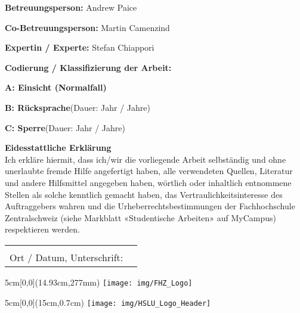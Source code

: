 \vspace{0.6cm}
\noindent
\textbf{Betreuungsperson:} Andrew Paice

\vspace{0.6cm}
\noindent
\textbf{Co-Betreuungsperson:} Martin Camenzind

\vspace{0.6cm}
\noindent
\textbf{Expertin / Experte:} Stefan Chiappori

\vspace{0.6cm}
\noindent
\textbf{Codierung / Klassifizierung der Arbeit:}

\begin{todolist}
	\item[\xmark]\textbf{A: Einsicht (Normalfall)}
	\item \textbf{B: Rücksprache}\hspace*{0.7cm}(Dauer:\hspace*{1cm} Jahr / Jahre)
	\item \textbf{C: Sperre}\hspace*{1.865cm}(Dauer:\hspace*{1cm} Jahr / Jahre)
\end{todolist}

\vfill

\noindent
\textbf{Eidesstattliche Erklärung}
\\
Ich erkläre hiermit, dass ich/wir die vorliegende Arbeit selbständig und ohne unerlaubte fremde Hilfe angefertigt haben, alle verwendeten Quellen, Literatur und andere Hilfsmittel angegeben haben, wörtlich oder inhaltlich entnommene Stellen als solche kenntlich gemacht haben, das Vertraulichkeitsinteresse des Auftraggebers wahren und die Urheberrechtsbestimmungen der Fachhochschule Zentralschweiz (siehe Markblatt «Studentische Arbeiten» auf MyCampus) respektieren werden.

\vspace{1em}

\noindent
\begin{tabularx}{\textwidth}{@{}lX}
	&\\
	Ort / Datum, Unterschrift: &  \\
	\cline{2-2}
\end{tabularx}

\begin{textblock*}{5cm}[0,0](14.93cm,277mm)
	\texttt{[image: img/FHZ\_Logo]}
\end{textblock*}

\newpage

\begin{textblock*}{5cm}[0,0](15cm,0.7cm)
	\texttt{[image: img/HSLU\_Logo\_Header]}
\end{textblock*}


